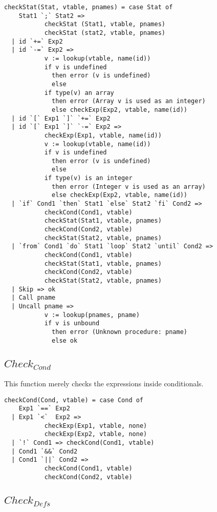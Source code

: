 \begin{verbatim}
checkStat(Stat, vtable, pnames) = case Stat of
    Stat1 `;` Stat2 =>
           checkStat (Stat1, vtable, pnames)
           checkStat (stat2, vtable, pnames)
  | id `+=` Exp2
  | id `-=` Exp2 =>
           v := lookup(vtable, name(id))
           if v is undefined
             then error (v is undefined)
             else
           if type(v) an array
             then error (Array v is used as an integer)
             else checkExp(Exp2, vtable, name(id))
  | id `[` Exp1 `]` `+=` Exp2
  | id `[` Exp1 `]` `-=` Exp2 =>
           checkExp(Exp1, vtable, name(id))
           v := lookup(vtable, name(id))
           if v is undefined
             then error (v is undefined)
             else
           if type(v) is an integer
             then error (Integer v is used as an array)
             else checkExp(Exp2, vtable, name(id))
  | `if` Cond1 `then` Stat1 `else` Stat2 `fi` Cond2 =>
           checkCond(Cond1, vtable)
           checkStat(Stat1, vtable, pnames)
           checkCond(Cond2, vtable)
           checkStat(Stat2, vtable, pnames)
  | `from` Cond1 `do` Stat1 `loop` Stat2 `until` Cond2 =>
           checkCond(Cond1, vtable)
           checkStat(Stat1, vtable, pnames)
           checkCond(Cond2, vtable)
           checkStat(Stat2, vtable, pnames)
  | Skip => ok
  | Call pname
  | Uncall pname =>
           v := lookup(pnames, pname)
           if v is unbound
             then error (Unknown procedure: pname)
             else ok
\end{verbatim}

\subsection{$Check_{Cond}$}

This function merely checks the expressions inside conditionals.

\begin{verbatim}
checkCond(Cond, vtable) = case Cond of
    Exp1 `==` Exp2
  | Exp1 `<`  Exp2 =>
           checkExp(Exp1, vtable, none)
           checkExp(Exp2, vtable, none)
  | `!` Cond1 => checkCond(Cond1, vtable)
  | Cond1 `&&` Cond2
  | Cond1 `||` Cond2 =>
           checkCond(Cond1, vtable)
           checkCond(Cond2, vtable)
\end{verbatim}

\subsection{$Check_{Defs}$}

